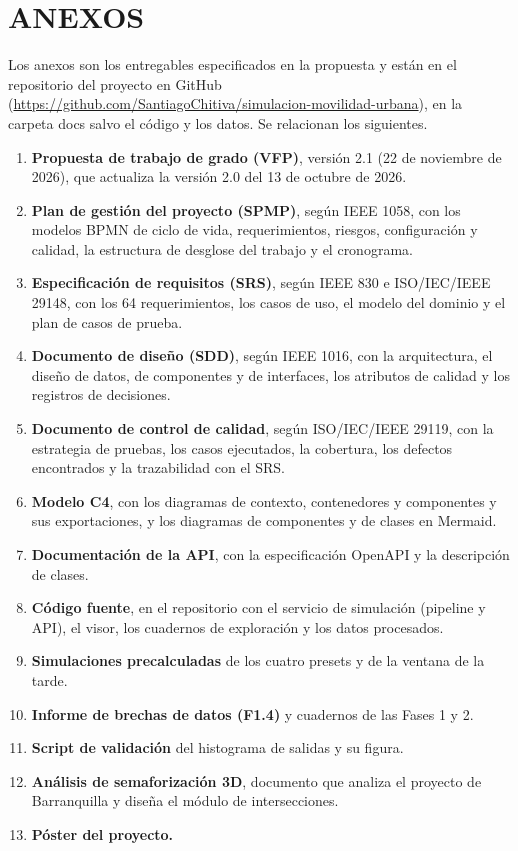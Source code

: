 \section{ANEXOS}

Los anexos son los entregables especificados en la propuesta y están en el repositorio del proyecto en GitHub (\url{https://github.com/SantiagoChitiva/simulacion-movilidad-urbana}), en la carpeta docs salvo el código y los datos. Se relacionan los siguientes.

\begin{enumerate}[noitemsep]
    \item \textbf{Propuesta de trabajo de grado (VFP)}, versión 2.1 (22 de noviembre de 2026), que actualiza la versión 2.0 del 13 de octubre de 2026.
    \item \textbf{Plan de gestión del proyecto (SPMP)}, según IEEE 1058, con los modelos BPMN de ciclo de vida, requerimientos, riesgos, configuración y calidad, la estructura de desglose del trabajo y el cronograma.
    \item \textbf{Especificación de requisitos (SRS)}, según IEEE 830 e ISO/IEC/IEEE 29148, con los 64 requerimientos, los casos de uso, el modelo del dominio y el plan de casos de prueba.
    \item \textbf{Documento de diseño (SDD)}, según IEEE 1016, con la arquitectura, el diseño de datos, de componentes y de interfaces, los atributos de calidad y los registros de decisiones.
    \item \textbf{Documento de control de calidad}, según ISO/IEC/IEEE 29119, con la estrategia de pruebas, los casos ejecutados, la cobertura, los defectos encontrados y la trazabilidad con el SRS.
    \item \textbf{Modelo C4}, con los diagramas de contexto, contenedores y componentes y sus exportaciones, y los diagramas de componentes y de clases en Mermaid.
    \item \textbf{Documentación de la API}, con la especificación OpenAPI y la descripción de clases.
    \item \textbf{Código fuente}, en el repositorio con el servicio de simulación (pipeline y API), el visor, los cuadernos de exploración y los datos procesados.
    \item \textbf{Simulaciones precalculadas} de los cuatro presets y de la ventana de la tarde.
    \item \textbf{Informe de brechas de datos (F1.4)} y cuadernos de las Fases 1 y 2.
    \item \textbf{Script de validación} del histograma de salidas y su figura.
    \item \textbf{Análisis de semaforización 3D}, documento que analiza el proyecto de Barranquilla y diseña el módulo de intersecciones.
    \item \textbf{Póster del proyecto.}
\end{enumerate}
